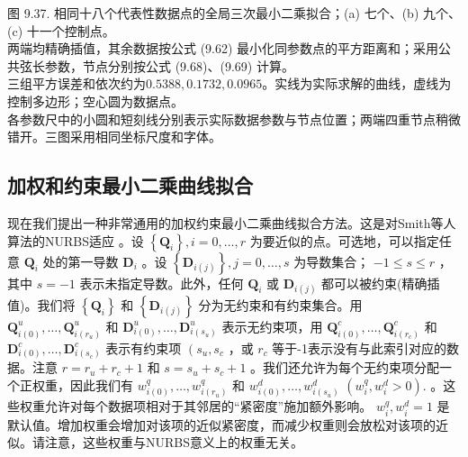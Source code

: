 \documentclass[../main.tex]{subfiles}
\begin{document}
\begin{center}
\begin{minipage}{37cm}
\vspace*{.6\baselineskip}
\centering
{}
\par\smallskip
{}
\par\smallskip
图 9.37. 相同十八个代表性数据点的全局三次最小二乘拟合；(a) 七个、(b) 九个、(c) 十一个控制点。\\
两端均精确插值，其余数据按公式 (9.62) 最小化同参数点的平方距离和；采用公共弦长参数，节点分别按公式 (9.68)、(9.69) 计算。\\
三组平方误差和依次约为$0.5388,0.1732,0.0965$。实线为实际求解的曲线，虚线为控制多边形；空心圆为数据点。\\
各参数尺中的小圆和短刻线分别表示实际数据参数与节点位置；两端四重节点稍微错开。三图采用相同坐标尺度和字体。
\end{minipage}
\end{center}

\subsection{加权和约束最小二乘曲线拟合}

现在我们提出一种非常通用的加权约束最小二乘曲线拟合方法。这是对Smith等人算法的NURBS适应 \cite{Smit74}。设 \(\left\{  {\mathbf{Q}}_{i}\right\}  ,i = 0,\ldots ,r\) 为要近似的点。可选地，可以指定任意 \({\mathbf{Q}}_{i}\) 处的第一导数 \({\mathbf{D}}_{i}\) 。设 \(\left\{  {\mathbf{D}}_{i\left( j\right) }\right\}  ,j = 0,\ldots ,s\) 为导数集合； \(- 1 \leq  s \leq  r\) ，其中 \(s =  - 1\) 表示未指定导数。此外，任何 \({\mathbf{Q}}_{i}\) 或 \({\mathbf{D}}_{i\left( j\right) }\) 都可以被约束(精确插值)。我们将 \(\left\{  {\mathbf{Q}}_{i}\right\}\) 和 \(\left\{  {\mathbf{D}}_{i\left( j\right) }\right\}\) 分为无约束和有约束集合。用 \({\mathbf{Q}}_{i\left( 0\right) }^{u},\ldots ,{\mathbf{Q}}_{i\left( {r}_{u}\right) }^{u}\) 和 \({\mathbf{D}}_{i\left( 0\right) }^{u},\ldots ,{\mathbf{D}}_{i\left( {s}_{u}\right) }^{u}\) 表示无约束项，用 \({\mathbf{Q}}_{i\left( 0\right) }^{c},\ldots ,{\mathbf{Q}}_{i\left( {r}_{c}\right) }^{c}\) 和 \({\mathbf{D}}_{i\left( 0\right) }^{c},\ldots ,{\mathbf{D}}_{i\left( {s}_{c}\right) }^{c}\) 表示有约束项 \(\left( {{s}_{u},{s}_{c}}\right.\) ，或 \({r}_{c}\) 等于-1表示没有与此索引对应的数据。注意 \(r = {r}_{u} + {r}_{c} + 1\) 和 \(s = {s}_{u} + {s}_{c} + 1\) 。我们还允许为每个无约束项分配一个正权重，因此我们有 \({w}_{i\left( 0\right) }^{q},\ldots ,{w}_{i\left( {r}_{u}\right) }^{q}\) 和 \({w}_{i\left( 0\right) }^{d},\ldots ,{w}_{i\left( {s}_{u}\right) }^{d}\)  \(\left( {{w}_{i}^{q},{w}_{i}^{d} > 0}\right) .\) 。这些权重允许对每个数据项相对于其邻居的“紧密度”施加额外影响。 \({w}_{i}^{q},{w}_{i}^{d} = 1\) 是默认值。增加权重会增加对该项的近似紧密度，而减少权重则会放松对该项的近似。请注意，这些权重与NURBS意义上的权重无关。
\end{document}
